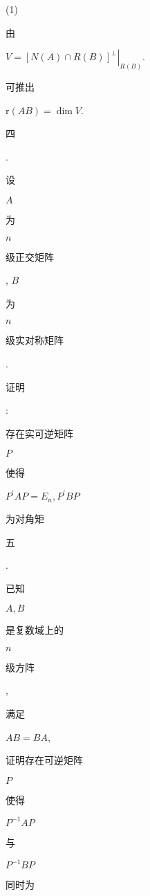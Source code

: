 \documentclass[10pt]{article}
\begin{document}
(1) \begin{CJK}{UTF8}{mj}由\end{CJK} $V=\left.[N(A) \cap R(B)]^{\perp}\right|_{R(B)}$. \begin{CJK}{UTF8}{mj}可推出\end{CJK} $\mathrm{r}(A B)=\operatorname{dim} V$.

\begin{CJK}{UTF8}{mj}四\end{CJK}. \begin{CJK}{UTF8}{mj}设\end{CJK} $A$ \begin{CJK}{UTF8}{mj}为\end{CJK} $n$ \begin{CJK}{UTF8}{mj}级正交矩阵\end{CJK}, $B$ \begin{CJK}{UTF8}{mj}为\end{CJK} $n$ \begin{CJK}{UTF8}{mj}级实对称矩阵\end{CJK}. \begin{CJK}{UTF8}{mj}证明\end{CJK}: \begin{CJK}{UTF8}{mj}存在实可逆矩阵\end{CJK} $P$ \begin{CJK}{UTF8}{mj}使得\end{CJK} $P^{\prime} A P=E_{n}, P^{\prime} B P$ \begin{CJK}{UTF8}{mj}为对角矩\end{CJK}

\begin{CJK}{UTF8}{mj}五\end{CJK}. \begin{CJK}{UTF8}{mj}已知\end{CJK} $A, B$ \begin{CJK}{UTF8}{mj}是复数域上的\end{CJK} $n$ \begin{CJK}{UTF8}{mj}级方阵\end{CJK}, \begin{CJK}{UTF8}{mj}满足\end{CJK} $A B=B A$, \begin{CJK}{UTF8}{mj}证明存在可逆矩阵\end{CJK} $P$ \begin{CJK}{UTF8}{mj}使得\end{CJK} $P^{-1} A P$ \begin{CJK}{UTF8}{mj}与\end{CJK} $P^{-1} B P$ \begin{CJK}{UTF8}{mj}同时为\end{CJK}
\end{document}
